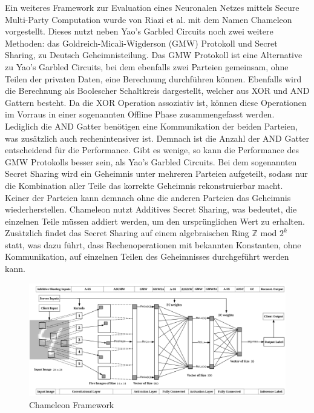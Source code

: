 Ein weiteres Framework zur Evaluation eines Neuronalen Netzes mittels Secure Multi-Party Computation wurde von Riazi et al. \cite{P-72} mit dem Namen Chameleon vorgestellt.
Dieses nutzt neben Yao's Garbled Circuits noch zwei weitere Methoden: das Goldreich-Micali-Wigderson (GMW) Protokoll und Secret Sharing, zu Deutsch Geheimnisteilung.
Das GMW Protokoll ist eine Alternative zu Yao's Garbled Circuits, bei dem ebenfalls zwei Parteien gemeinsam, ohne Teilen der privaten Daten, eine Berechnung durchführen können.
Ebenfalls wird die Berechnung als Boolescher Schaltkreis dargestellt, welcher aus XOR und AND Gattern besteht. 
Da die XOR Operation assoziativ ist, können diese Operationen im Vorraus in einer sogenannten Offline Phase zusammengefasst werden. 
Lediglich die AND Gatter benötigen eine Kommunikation der beiden Parteien, was zusätzlich auch rechenintensiver ist.
Demnach ist die Anzahl der AND Gatter entscheidend für die Performance.
Gibt es wenige, so kann die Performance des GMW Protokolls besser sein, als Yao's Garbled Circuits.
Bei dem sogenannten Secret Sharing wird ein Geheimnis unter mehreren Parteien aufgeteilt, sodass nur die Kombination aller Teile das korrekte Geheimnis rekonstruierbar macht.
Keiner der Parteien kann demnach ohne die anderen Parteien das Geheimnis wiederherstellen. 
Chameleon nutzt Additives Secret Sharing, was bedeutet, die einzelnen Teile müssen addiert werden, um den ursprünglichen Wert zu erhalten.
Zusätzlich findet das Secret Sharing auf einem algebraischen Ring $\mathbb{Z}$ mod $2^{k} $ statt, was dazu führt, dass Rechenoperationen mit bekannten Konstanten, ohne Kommunikation, auf einzelnen Teilen des Geheimnisses durchgeführt werden kann.

\begin{figure}[!htb]
    \centering
    \includegraphics[width=15cm]{figures/chameleon.png}
    \caption{Chameleon Framework \cite{P-72}}
    \label{fig:chameleon}
\end{figure} 

